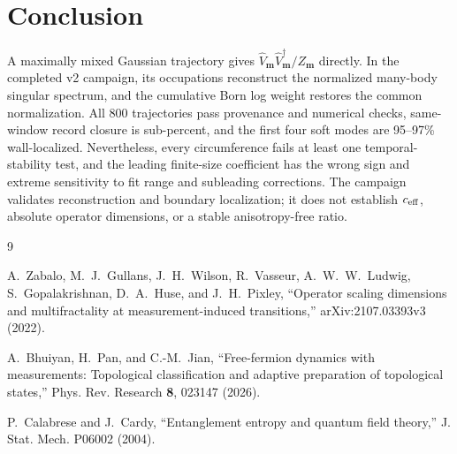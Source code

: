 \documentclass[aps,prb,twocolumn,floatfix,nofootinbib,superscriptaddress]{revtex4-2}
\begin{document}
\section{Conclusion}

A maximally mixed Gaussian trajectory gives \(\hat V_{\boldsymbol m}\hat V_{\boldsymbol m}^{\dagger}/Z_{\boldsymbol m}\) directly.  In the completed v2 campaign, its occupations reconstruct the normalized many-body singular spectrum, and the cumulative Born log weight restores the common normalization.  All 800 trajectories pass provenance and numerical checks, same-window record closure is sub-percent, and the first four soft modes are 95--97\% wall-localized.  Nevertheless, every circumference fails at least one temporal-stability test, and the leading finite-size coefficient has the wrong sign and extreme sensitivity to fit range and subleading corrections.  The campaign validates reconstruction and boundary localization; it does not establish \(c_{\rm eff}\), absolute operator dimensions, or a stable anisotropy-free ratio.

\clearpage
\begin{thebibliography}{9}

A.~Zabalo, M.~J.~Gullans, J.~H.~Wilson, R.~Vasseur,
A.~W.~W.~Ludwig, S.~Gopalakrishnan, D.~A.~Huse, and J.~H.~Pixley,
``Operator scaling dimensions and multifractality at measurement-induced transitions,''
arXiv:2107.03393v3 (2022).

A.~Bhuiyan, H.~Pan, and C.-M.~Jian,
``Free-fermion dynamics with measurements: Topological classification and adaptive preparation of topological states,''
Phys. Rev. Research \textbf{8}, 023147 (2026).

P.~Calabrese and J.~Cardy,
``Entanglement entropy and quantum field theory,''
J. Stat. Mech. P06002 (2004).

\end{thebibliography}
\end{document}

